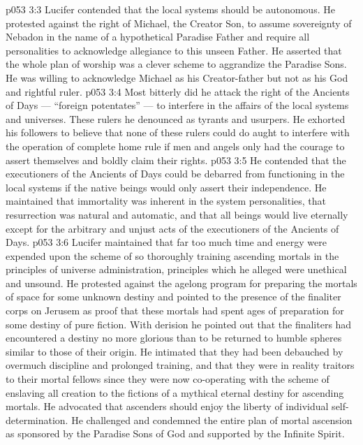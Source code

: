 \vs p053 3:3 \pc {}\bibnobreakspace {} Lucifer contended that the local systems should be autonomous. He protested against the right of Michael, the Creator Son, to assume sovereignty of Nebadon in the name of a hypothetical Paradise Father and require all personalities to acknowledge allegiance to this unseen Father. He asserted that the whole plan of worship was a clever scheme to aggrandize the Paradise Sons. He was willing to acknowledge Michael as his Creator\hyp{}father but not as his God and rightful ruler.
\vs p053 3:4 Most bitterly did he attack the right of the Ancients of Days --- “foreign potentates” --- to interfere in the affairs of the local systems and universes. These rulers he denounced as tyrants and usurpers. He exhorted his followers to believe that none of these rulers could do aught to interfere with the operation of complete home rule if men and angels only had the courage to assert themselves and boldly claim their rights.
\vs p053 3:5 He contended that the executioners of the Ancients of Days could be debarred from functioning in the local systems if the native beings would only assert their independence. He maintained that immortality was inherent in the system personalities, that resurrection was natural and automatic, and that all beings would live eternally except for the arbitrary and unjust acts of the executioners of the Ancients of Days.
\vs p053 3:6 \pc {}\bibnobreakspace {} Lucifer maintained that far too much time and energy were expended upon the scheme of so thoroughly training ascending mortals in the principles of universe administration, principles which he alleged were unethical and unsound. He protested against the agelong program for preparing the mortals of space for some unknown destiny and pointed to the presence of the finaliter corps on Jerusem as proof that these mortals had spent ages of preparation for some destiny of pure fiction. With derision he pointed out that the finaliters had encountered a destiny no more glorious than to be returned to humble spheres similar to those of their origin. He intimated that they had been debauched by overmuch discipline and prolonged training, and that they were in reality traitors to their mortal fellows since they were now co\hyp{}operating with the scheme of enslaving all creation to the fictions of a mythical eternal destiny for ascending mortals. He advocated that ascenders should enjoy the liberty of individual self\hyp{}determination. He challenged and condemned the entire plan of mortal ascension as sponsored by the Paradise Sons of God and supported by the Infinite Spirit.

